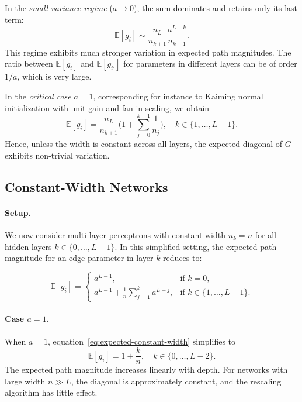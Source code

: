 \documentclass{article}
\theoremstyle{plain}
\theoremstyle{definition}
\theoremstyle{remark}
\begin{document}
In the \emph{small variance regime} ($a \to 0$), the sum dominates and retains only its last term:
\[
\mathbb{E}[g_i] \sim \frac{n_L}{n_{k+1}} \frac{a^{L-k}}{n_{k-1}}.
\]
This regime exhibits much stronger variation in expected path magnitudes. The ratio between $\mathbb{E}[g_i]$ and $\mathbb{E}[g_{i'}]$ for parameters in different layers can be of order $1/a$, which is very large.

In the \emph{critical case} $a=1$, corresponding for instance to Kaiming normal initialization with unit gain and fan-in scaling, we obtain
\[
\mathbb{E}[g_i] = \frac{n_L}{n_{k+1}} \bigg(1 + \sum_{j=0}^{k-1} \frac{1}{n_j}\bigg), \quad k \in \{1,\dots,L-1\}.
\]
Hence, unless the width is constant across all layers, the expected diagonal of $G$ exhibits non-trivial variation.

\subsection{Constant-Width Networks}

\paragraph{Setup.}
We now consider multi-layer perceptrons with constant width $n_k = n$ for all hidden layers $k \in \{0, \ldots, L-1\}$. In this simplified setting, the expected path magnitude for an edge parameter in layer $k$ reduces to:

\begin{equation}
\label{eq:expected-constant-width}
\mathbb{E}[g_i] = 
\begin{cases}
a^{L-1}, & \text{if } k = 0,\\[6pt]
\displaystyle a^{L-1} + \frac{1}{n}\sum_{j=1}^{k} a^{L-j}, & \text{if } k \in \{1, \ldots, L-1\}.
\end{cases}
\end{equation}

\paragraph{Case $a=1$.}
When $a=1$, equation~\eqref{eq:expected-constant-width} simplifies to
\begin{equation}
\label{eq:expected-a1}
\mathbb{E}[g_i] = 1 + \frac{k}{n}, \quad k \in \{0, \ldots, L-2\}.
\end{equation}
The expected path magnitude increases linearly with depth. For networks with large width $n \gg L$, the diagonal is approximately constant, and the rescaling algorithm has little effect.
\end{document}
